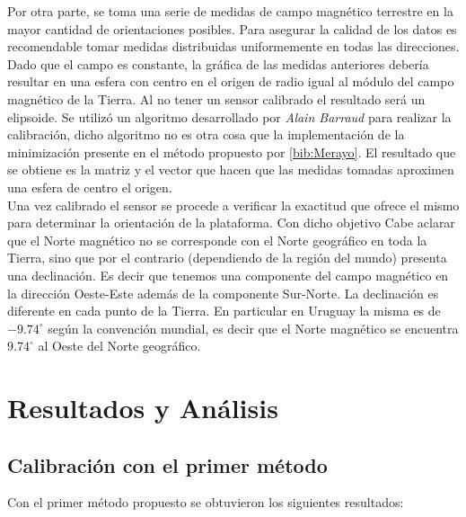 \documentclass[main]{subfiles}
\begin{document}
Por otra parte, se toma una serie de medidas de campo magnético terrestre en la mayor cantidad de  orientaciones posibles. Para asegurar la calidad de los datos es recomendable tomar medidas distribuidas uniformemente en todas las direcciones. Dado que el campo es constante, la gráfica de las medidas anteriores debería resultar en una esfera con centro en el origen de radio igual al módulo del campo magnético de la Tierra. Al no tener un sensor calibrado el resultado será un elipsoide. Se utilizó un algoritmo desarrollado por \emph{Alain Barraud} para realizar la calibración, dicho algoritmo no es otra cosa que la implementación de la minimización presente en el método propuesto por \ref{bib:Merayo}. El resultado que se obtiene es la matriz y el vector que hacen que las medidas tomadas aproximen una esfera de centro el origen.\\

Una vez calibrado el sensor se procede a verificar la exactitud que ofrece el mismo para determinar la orientación de la plataforma. Con dicho objetivo 
Cabe aclarar que el Norte magn\'etico no se corresponde con el Norte geogr\'afico en toda la Tierra, sino que por el contrario (dependiendo de la regi\'on del mundo) presenta una declinaci\'on. Es decir que tenemos una componente del campo magn\'etico en la dirección Oeste-Este adem\'as de la componente Sur-Norte. La declinaci\'on es diferente en cada punto de la 
Tierra. En particular en Uruguay la misma es de $-9.74^{\circ}$ seg\'un la convenci\'on mundial, es decir que el Norte magn\'etico se encuentra $9.74^{\circ}$ al Oeste del Norte geogr\'afico. 

\section{Resultados y Análisis}

\subsection{Calibración con el primer método}

Con el primer método propuesto se obtuvieron los siguientes resultados:
\end{document}
